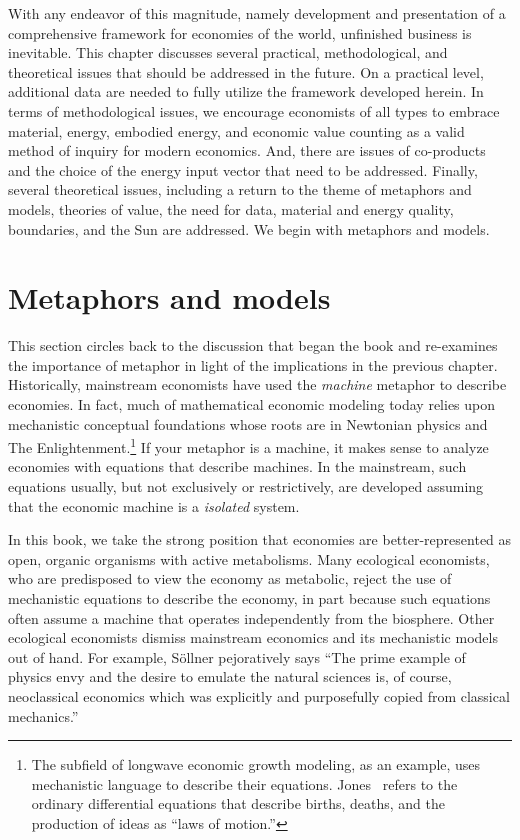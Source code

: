 With any endeavor of this magnitude, 
namely development and presentation 
of a comprehensive framework for economies of the world,
unfinished business is inevitable. 
This chapter discusses several 
practical, methodological, and theoretical issues
that should be addressed in the future.
On a practical level, additional data are needed 
to fully utilize the framework developed herein.
In terms of methodological issues, we encourage economists of all types to
embrace material, energy, embodied energy, and economic value counting 
as a valid method of inquiry for modern economics.
And, there are issues of co-products and the choice of the energy input vector
that need to be addressed.  
Finally, several theoretical issues, including
a return to the theme of metaphors and models,
theories of value,
the need for data,
material and energy quality, 
boundaries, and 
the Sun
are addressed.
We begin with metaphors and models.


\section{Metaphors and models}
\label{sec:metaphors_and_models}

This section circles back to the discussion that began the book and re-examines
the importance of metaphor in light of the implications in the previous chapter.
Historically, mainstream economists have used the \emph{machine} metaphor
to describe economies. 
In fact, much of mathematical economic modeling today 
relies upon mechanistic conceptual foundations whose roots 
are in Newtonian physics 
and The Enlightenment.\footnote{The subfield 
of longwave economic growth modeling, as an example, 
uses mechanistic language to describe their equations. 
Jones~\cite[pp.~6 \&~18]{Jones:2001wn} 
refers to the ordinary differential equations 
that describe births, deaths, and the production of ideas
as ``laws of motion.''}
If your metaphor is a machine, it makes sense to analyze economies
with equations that describe machines.
In the mainstream, such equations usually, but not exclusively or restrictively,
are developed assuming that the economic machine is a \emph{isolated} system.

In this book, we take the strong position that economies are
better-represented as open, organic organisms with active metabolisms.
Many ecological economists, 
who are predisposed to view the economy as metabolic,
reject the use of mechanistic equations 
to describe the economy, in part because such equations often assume a 
machine that operates independently from the biosphere.
Other ecological economists dismiss mainstream economics 
and its mechanistic models out of hand. 
For example, S{\"o}llner pejoratively says 
``The prime example of physics envy and the desire 
to emulate the natural sciences is, of course, 
neoclassical economics which was explicitly and purposefully 
copied from classical mechanics.''~\cite[p. 178]{Sollner:1997wx}

